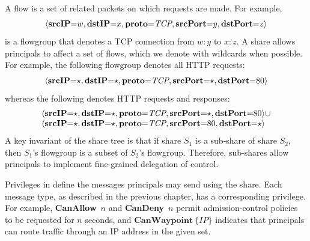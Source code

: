 \label{sec:Flowgroups}
A flow is a set of related packets on which requests are
made. For example,
\[
\langle\textbf{srcIP}\mathord{=}w,\textbf{dstIP}\mathord{=}x,\textbf{proto}\mathord{=}\textit{TCP},\textbf{srcPort}\mathord{=}y,\textbf{dstPort}\mathord{=}z\rangle
\]
is a flowgroup that denotes a TCP connection from $w:y$ to $x:z$. A
\sys share allows principals to affect a set of flows, which we denote
with wildcards when possible. For example, the following flowgroup
denotes all HTTP requests:
\[ 
  \langle\textbf{srcIP}\mathord{=}\star,\textbf{dstIP}\mathord{=}\star,\textbf{proto}\mathord{=}\textit{TCP},\textbf{srcPort}\mathord{=}\star,\textbf{dstPort}\mathord{=}80\rangle 
\]
whereas the following denotes HTTP requests and responses:
\[
  \begin{array}{l@{}l}
  \paneshare{\star}{\star}{\textit{TCP}}{\star}{80} & \cup \\
  \paneshare{\star}{\star}{\textit{TCP}}{80}{\star}
  \end{array}
\]
A key invariant of the share tree is that if share $S_1$ is a
sub-share of share $S_2$, then $S_1$'s flowgroup is a subset of $S_2$'s
flowgroup. Therefore, sub-shares allow principals to implement
fine-grained delegation of control.

%
Privileges in \sys define the messages principals may send using the share.
Each message type, as described in the previous chapter, has a corresponding
privilege. For example,
\textbf{CanAllow}~$n$ and \textbf{CanDeny}~$n$ permit
admission-control policies to be requested for $n$ seconds, and $\textbf{CanWaypoint}~\{\textit{IP}\}$
indicates that principals can route traffic through an IP address in the given set.
